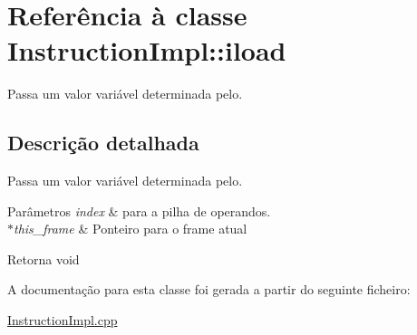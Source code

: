 \hypertarget{class_instruction_impl_1_1iload}{}\section{Referência à classe Instruction\+Impl\+:\+:iload}
\label{class_instruction_impl_1_1iload}


Passa um valor variável determinada pelo.  




\subsection{Descrição detalhada}
Passa um valor variável determinada pelo. 


\begin{DoxyParams}{Parâmetros}
{\em index} & para a pilha de operandos. \\
\hline
{\em $\ast$this\+\_\+frame} & Ponteiro para o frame atual \\
\hline
\end{DoxyParams}
\begin{DoxyReturn}{Retorna}
void 
\end{DoxyReturn}


A documentação para esta classe foi gerada a partir do seguinte ficheiro\+:\begin{DoxyCompactItemize}
\item 
\hyperlink{_instruction_impl_8cpp}{Instruction\+Impl.\+cpp}\end{DoxyCompactItemize}
